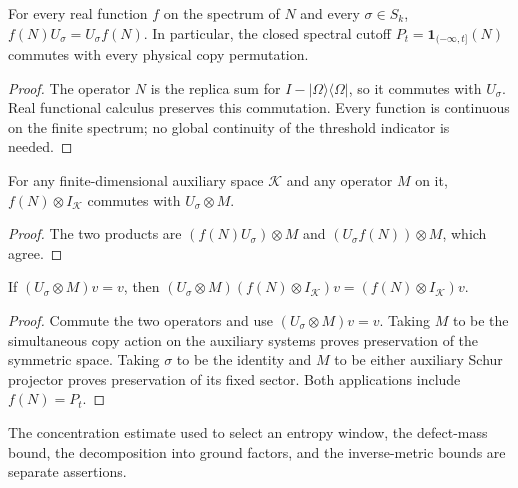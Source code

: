 \begin{theorem}
\label{thm:replica_cfc_copy_commute}
\leanok
{}
For every real function $f$ on the spectrum of $N$ and every $\sigma\in S_k$,
$f(N)U_\sigma=U_\sigma f(N)$.
In particular, the closed spectral cutoff $P_t=\mathbf1_{(-\infty,t]}(N)$
commutes with every physical copy permutation.
\end{theorem}
\begin{proof}
\leanok
{}
The operator $N$ is the replica sum for $I-|\Omega\rangle\langle\Omega|$,
so it commutes with $U_\sigma$. Real functional calculus preserves this
commutation. Every function is continuous on the finite spectrum; no global
continuity of the threshold indicator is needed.
\end{proof}

\begin{theorem}
\label{thm:replica_cfc_auxiliary_commute}
\leanok
{}
For any finite-dimensional auxiliary space $\mathcal K$ and any operator
$M$ on it, $f(N)\otimes I_{\mathcal K}$ commutes with $U_\sigma\otimes M$.
\end{theorem}
\begin{proof}
\leanok
{}
The two products are $(f(N)U_\sigma)\otimes M$ and
$(U_\sigma f(N))\otimes M$, which agree.
\end{proof}

\begin{theorem}
\label{thm:replica_cfc_preserves_fixed}
\leanok
{}
If $(U_\sigma\otimes M)v=v$, then
$(U_\sigma\otimes M)(f(N)\otimes I_{\mathcal K})v
=(f(N)\otimes I_{\mathcal K})v$.
\end{theorem}
\begin{proof}
\leanok
{}
Commute the two operators and use $(U_\sigma\otimes M)v=v$.
Taking $M$ to be the simultaneous copy action on the auxiliary systems proves
preservation of the symmetric space. Taking $\sigma$ to be the identity and
$M$ to be either auxiliary Schur projector proves preservation of its fixed
sector. Both applications include $f(N)=P_t$.
\end{proof}

The concentration estimate used to select an entropy window, the defect-mass
bound, the decomposition into ground factors, and the inverse-metric bounds
are separate assertions.
